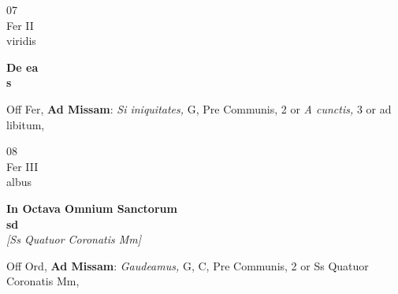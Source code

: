 \documentclass[10pt, openany]{book}
\begin{document}
        \begin{center}
            \begin{minipage}{3.5in}
                \vspace{2em}
                \begin{minipage}{0.5in}
                    {\Huge 07} \\
                    {\normalsize Fer II} \\
                    {\normalsize viridis}
                \end{minipage}
                \begin{minipage}{3.0in}
                    \textbf{ \large De ea \\
                    \textnormal{\normalsize s}} \\ 
                \end{minipage}
                \begin{justify}Off Fer, \textbf{Ad Missam}: \textit{Si iniquitates,} G, Pre Communis, 2 or \textit{A cunctis,} 3 or ad libitum,   
                \end{justify}
            \end{minipage}
        \end{center}
    
        \begin{center}
            \begin{minipage}{3.5in}
                \vspace{2em}
                \begin{minipage}{0.5in}
                    {\Huge 08} \\
                    {\normalsize Fer III} \\
                    {\normalsize albus}
                \end{minipage}
                \begin{minipage}{3.0in}
                    \textbf{ \large In Octava Omnium Sanctorum \\
                    \textnormal{\normalsize sd}} \\ \textit{[Ss Quatuor Coronatis Mm]} \\ 
                \end{minipage}
                \begin{justify}Off Ord, \textbf{Ad Missam}: \textit{Gaudeamus,} G, C, Pre Communis, 2 or Ss Quatuor Coronatis Mm,   
                \end{justify}
            \end{minipage}
        \end{center}
    
\end{document}
